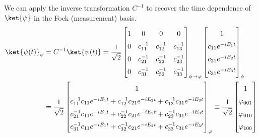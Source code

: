 We can apply the inverse transformation $C^{-1}$ to recover the time dependence of $\ket{\psi}$ in the Fock (measurement) basis.
\begin{equation*}
    \begin{aligned}
    \ket{\psi(t)}_{\varphi} & =
    C^{-1}\ket{\psi(t)}=
    \frac{1}{\sqrt{2}}
    \renewcommand*{\arraystretch}{1.5}
    \begin{bmatrix}
        1 & 0 & 0 & 0 \\
        0 & c^{-1}_{11} & c^{-1}_{12} & c^{-1}_{13} \\
        0 & c^{-1}_{21} & c^{-1}_{22} & c^{-1}_{23} \\
        0 & c^{-1}_{31} & c^{-1}_{32} & c^{-1}_{33} \\
    \end{bmatrix}_{\phi \rightarrow \varphi}
    \begin{bmatrix}
        1 \\
        c_{11} e^{-i E_1 t} \\
        c_{21} e^{-i E_2 t} \\
        c_{31} e^{-i E_3 t}\\
    \end{bmatrix}_{\phi}
    \\ & =
    \frac{1}{\sqrt{2}}
    \begin{bmatrix}
        1 \\
        c^{-1}_{11} c_{11} e^{-i E_1 t} +  c^{-1}_{12} c_{21} e^{-i E_2 t} + c^{-1}_{13} c_{31} e^{-i E_3 t} \\
        c^{-1}_{21} c_{11} e^{-i E_1 t} +  c^{-1}_{22} c_{21} e^{-i E_2 t} + c^{-1}_{23} c_{31} e^{-i E_3 t} \\
        c^{-1}_{31} c_{11} e^{-i E_1 t} +  c^{-1}_{32} c_{21} e^{-i E_2 t} + c^{-1}_{33} c_{31} e^{-i E_3 t} \\
    \end{bmatrix}_{\varphi}
    \equiv
    \frac{1}{\sqrt{2}}
    \begin{bmatrix}
    1 \\
    \varphi_{001}\\
    \varphi_{010}\\
    \varphi_{100}
    \end{bmatrix}
\end{aligned}
\end{equation*}

